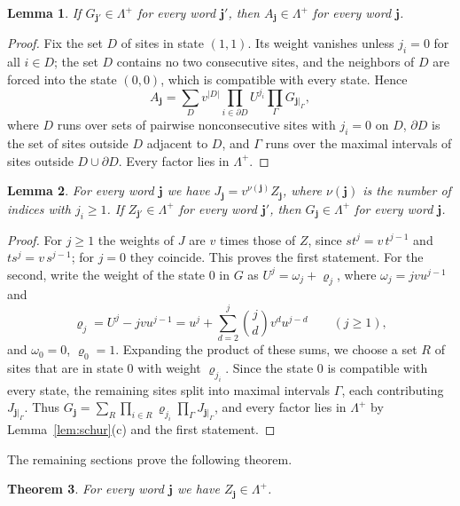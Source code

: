 \documentclass{amsart}
\newtheorem{theorem}{Theorem}[section]
\newtheorem{lemma}[theorem]{Lemma}
\theoremstyle{definition}
\theoremstyle{remark}
\numberwithin{equation}{section}
\newcommand{\jj}{\mathbf{j}}
\newcommand{\Lp}{\Lambda^{+}}
\begin{document}
\begin{lemma}\label{lem:AtoG}
If $G_{\jj'}\in\Lp$ for every word $\jj'$, then $A_\jj\in\Lp$ for every word $\jj$.
\end{lemma}

\begin{proof}
Fix the set $D$ of sites in state $(1,1)$. Its weight vanishes unless $j_i=0$ for all $i\in D$; the set $D$ contains no two consecutive sites, and the neighbors of $D$ are forced into the state $(0,0)$, which is compatible with every state. Hence
\[
A_\jj=\sum_D v^{|D|}\prod_{i\in \partial D}U^{j_i}\prod_{\Gamma}G_{\jj|_\Gamma},
\]
where $D$ runs over sets of pairwise nonconsecutive sites with $j_i=0$ on $D$, $\partial D$ is the set of sites outside $D$ adjacent to $D$, and $\Gamma$ runs over the maximal intervals of sites outside $D\cup \partial D$. Every factor lies in $\Lp$.
\end{proof}

\begin{lemma}\label{lem:GtoZ}
For every word $\jj$ we have $J_\jj=v^{\nu(\jj)}Z_\jj$, where $\nu(\jj)$ is the number of indices with $j_i\ge1$. If $Z_{\jj'}\in\Lp$ for every word $\jj'$, then $G_\jj\in\Lp$ for every word $\jj$.
\end{lemma}

\begin{proof}
For $j\ge1$ the weights of $J$ are $v$ times those of $Z$, since $st^j=v\,t^{j-1}$ and $ts^j=v\,s^{j-1}$; for $j=0$ they coincide. This proves the first statement. For the second, write the weight of the state $0$ in $G$ as $U^j=\omega_j+\varrho_j$, where $\omega_j=jvu^{j-1}$ and
\[
\varrho_j=U^j-jvu^{j-1}=u^j+\sum_{d=2}^{j}\binom jd v^du^{j-d}\qquad(j\ge1),
\]
and $\omega_0=0$, $\varrho_0=1$. Expanding the product of these sums, we choose a set $R$ of sites that are in state $0$ with weight $\varrho_{j_i}$. Since the state $0$ is compatible with every state, the remaining sites split into maximal intervals $\Gamma$, each contributing $J_{\jj|_\Gamma}$. Thus $G_\jj=\sum_R\prod_{i\in R}\varrho_{j_i}\prod_\Gamma J_{\jj|_\Gamma}$, and every factor lies in $\Lp$ by Lemma~\ref{lem:schur}(c) and the first statement.
\end{proof}

The remaining sections prove the following theorem.

\begin{theorem}\label{thm:Z}
For every word $\jj$ we have $Z_\jj\in\Lp$.
\end{theorem}
\end{document}
